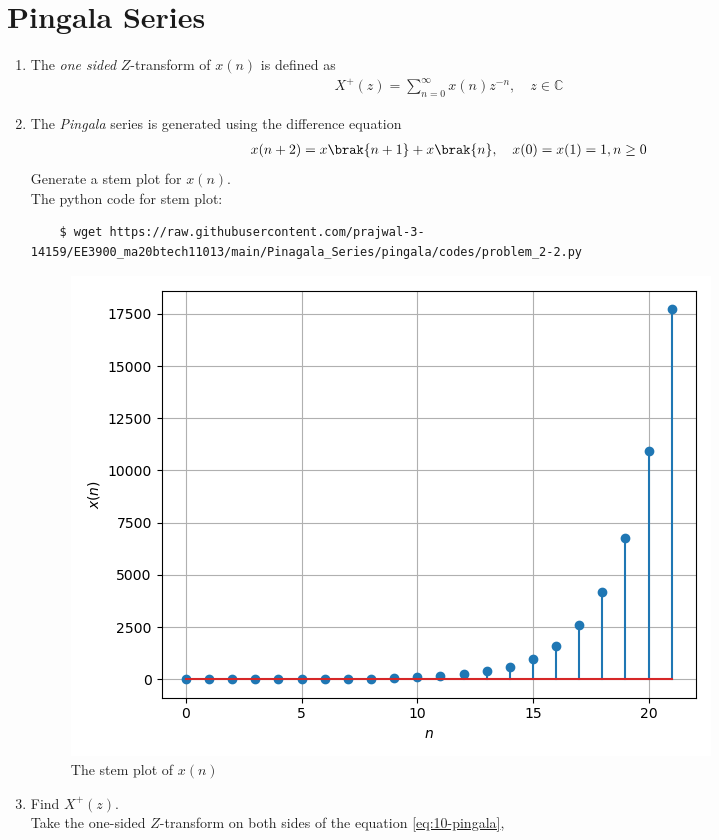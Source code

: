 \documentclass[journal,12pt,twocolumn]{IEEEtran}
\renewcommand\thesection{\arabic{section}}
\begin{document}
\section{Pingala Series}
\begin{enumerate}[label=\thesection.\arabic*,ref=\thesection.\theenumi]
\item The {\em one sided} $Z$-transform of $x(n)$ is defined as 
\begin{align}
	X^{+}(z) = \sum_{n = 0}^{\infty}x(n)z^{-n}, \quad z \in \mathbb{C}
	\label{eq:one-Z}
\end{align}
\item The {\em Pingala} series is generated using the difference equation 
\begin{align}
	x(n+2) = x\brak{n+1} + x\brak{n}, \quad x(0) = x(1) = 1, n \ge 0
	\label{eq:10-pingala}
\end{align}
Generate a stem plot for $x(n)$.\\
\solution The python code for stem plot:
\begin{lstlisting}
	$ wget https://raw.githubusercontent.com/prajwal-3-14159/EE3900_ma20btech11013/main/Pinagala_Series/pingala/codes/problem_2-2.py
\end{lstlisting}
\begin{figure}[!ht]
	\centering
	\includegraphics[width=\columnwidth]{./figs/Ex_2.2.png}
	\caption{The stem plot of $x(n)$}
	\label{fig:xnyn}
\end{figure}
\item  Find $X^{+}(z)$.\\
\solution Take the one-sided $Z$-transform on both sides of the equation \eqref{eq:10-pingala},

\end{enumerate}
\end{document}
